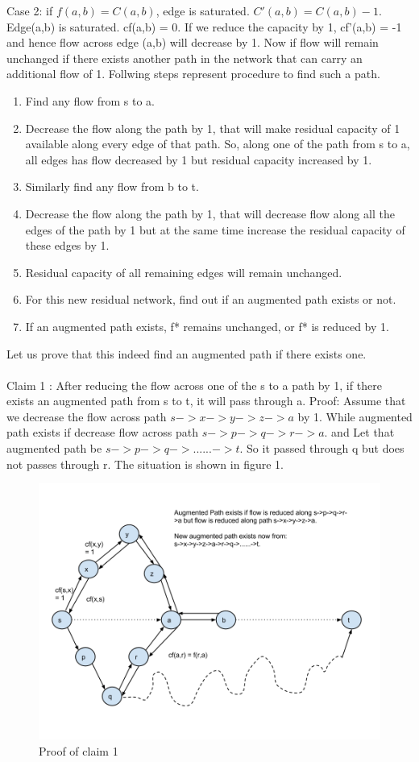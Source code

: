 	Case 2: if $f(a,b) = C(a,b)$, edge is saturated. $C'(a,b) = C(a,b) - 1$. 
	Edge(a,b) is saturated. cf(a,b) = 0. If we reduce the capacity by 1, cf'(a,b) = -1 and hence flow across edge (a,b) will decrease by 1. Now if flow will remain unchanged if there exists another path in the network that can carry an additional flow of 1. Follwing steps represent procedure to find such a path.
	\begin{enumerate}
	\item Find any flow from s to a. 
	\item Decrease the flow along the path by 1, that will make residual capacity of 1 available along every edge of that path. So, along one of the path from s to a, all edges has flow decreased by 1 but residual capacity increased by 1. 
	\item Similarly find any flow from b to t.
	\item Decrease the flow along the path by 1, that will decrease flow along all the edges of the path by 1 but at the same time increase the residual capacity of these edges by 1. 
	\item Residual capacity of all remaining edges will remain unchanged. 
	\item For this new residual network, find out if an augmented path exists or not.
	\item If an augmented path exists, f* remains unchanged, or f* is reduced by 1. 
	\end{enumerate}		
	
	Let us prove that this indeed find an augmented path if there exists one.	
	\\
	\\
	Claim 1 : After reducing the flow across one of the s to a path by 1, if there exists an augmented path from s to t, it will pass through a. 
	Proof:	
	Assume that we decrease the flow across path $s->x->y->z->a$  by 1. While augmented path exists if decrease flow across path $s->p->q->r->a$. and Let that augmented path be $s->p->q->......->t$. So it passed through q but does not passes through r.
	The situation is shown in figure 1.
	\begin{figure}[1a]
    \centering
    \includegraphics[scale=0.20]{1a}
    \caption{Proof of claim 1}
    \label{fig:1a}
\end{figure}
 
